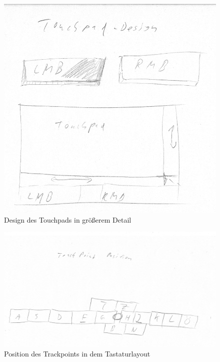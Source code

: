 \documentclass[a4paper,10pt]{scrartcl}
\begin{document}
\begin{figure}
	\includegraphics[scale=0.5]{touchpadDesign_scaled}
	\caption{Design des Touchpads in größerem Detail}
\end{figure}

\begin{figure}
	\includegraphics[scale=0.5]{trackPointPosition_scaled}
	\caption{Position des Trackpoints in dem Tastaturlayout}
\end{figure}
\end{document}
